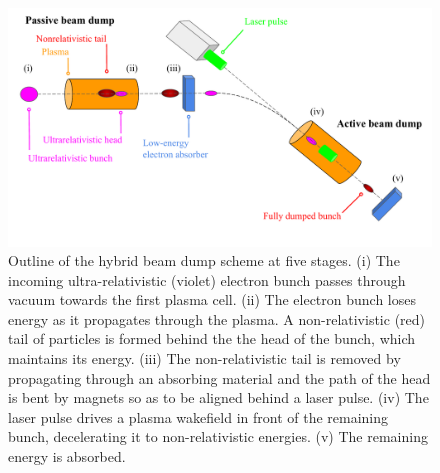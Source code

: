 \begin{figure}
\centering
\includegraphics[width=\textwidth]{hybrid_outline5.pdf} %
\caption{\small{Outline of the hybrid beam dump scheme at five stages. (i) The incoming ultra-relativistic (violet) electron bunch passes through vacuum towards the first plasma cell. (ii) The electron bunch loses energy as it propagates through the plasma. A non-relativistic (red) tail of particles is formed behind the the head of the bunch, which maintains its energy. (iii) The non-relativistic tail is removed by propagating through an absorbing material and the path of the head is bent by magnets so as to be aligned behind a laser pulse. (iv) The laser pulse drives a plasma wakefield in front of the remaining bunch, decelerating it to non-relativistic energies. (v) The remaining energy is absorbed.}} %
\label{hybrid_outline}
\end{figure}
